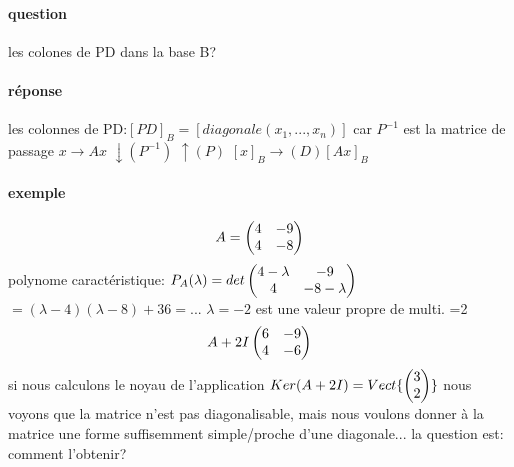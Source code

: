 \documentclass[a4paper,10pt]{article}
\begin{document}
\paragraph{question}
les colones de PD dans la base B?
\paragraph{réponse}
les colonnes de PD:$[PD]_B=[diagonale (x_1,...,x_n)]$ car $P^{-1}$ est la matrice de passage
\newline
$x\to Ax$ 
\newline
$\downarrow(P^{-1})$ $\uparrow(P)$
\newline
$[x]_B\to(D) [Ax]_B$
\paragraph{exemple}
\[
A=
\begin{pmatrix}
 4&-9\cr
 4&-8\cr
\end{pmatrix}
\]
\newline
polynome caractéristique: $P_A(\lambda)=det\begin{pmatrix}
                                            4-\lambda&-9\cr
                                            4&-8-\lambda\cr
                                           \end{pmatrix}$
\newline
$=(\lambda -4)(\lambda-8)+36=...
$
\newline
$\lambda =-2$ est une valeur propre de multi. =2
\newline
\[
  A+ 2I
  \begin{pmatrix}
   6&-9\cr
   4&-6\cr
  \end{pmatrix}
\]
\newline
si nous calculons le noyau de l'application $Ker(A+ 2I)=Vect\{\begin{pmatrix}
                                                                   3\cr
                                                                   2\cr
                                                                  \end{pmatrix}
\}$
\newline
nous voyons que la matrice n'est pas diagonalisable, mais nous voulons donner à la matrice une forme suffisemment simple/proche d'une diagonale...
\newline
la question est: comment l'obtenir?
\end{document}
